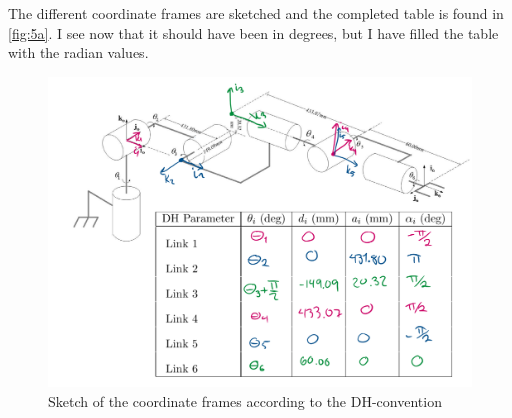 \documentclass[a4paper]{scrartcl}
\begin{document}
\section{}
\subsection{}
The different coordinate frames are sketched and the completed table is found in \autoref{fig:5a}. I see now that it should have been in degrees, but I have filled the table with the radian values.   
\begin{figure}[h!]
    \centering
    \includegraphics[width = .95\textwidth]{5a.PNG}
    \caption{Sketch of the coordinate frames according to the DH-convention}
    \label{fig:5a}
\end{figure}
\end{document}
